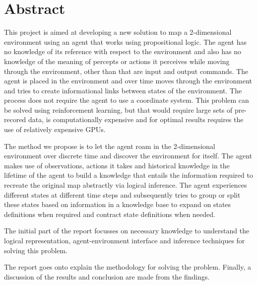 \chapter{Abstract}

%
%

This project is aimed at developing a new solution to map a 2-dimensional environment using an agent that works using propositional logic. The agent has no knowledge of its reference with respect to the environment and also has no knowledge of the meaning of percepts or actions it perceives while moving through the environment, other than that are input and output commands.  The agent is placed in the environment and over time moves through the environment and tries to create informational links between states of the environment. 
The process does not require the agent to use a coordinate system. This problem can be solved using reinforcement learning, but that would require large sets of pre-recored data, is computationally expensive and for optimal results requires the use of relatively expensive GPUs.

The method we propose is to let the agent roam in the 2-dimensional environment over discrete time and discover the environment for itself.
The agent makes use of observations, actions it takes and historical knowledge in the lifetime of the agent to build a knowledge that entails the information required to recreate the original map abstractly via logical inference. 
The agent experiences different states at different time steps and subsequently tries to group or split these states based on information in a knowledge base to expand on states definitions when required and contract state definitions when needed.


The initial part of the report focusses on necessary knowledge to understand the logical representation, agent-environment interface and inference techniques for solving this problem. 

The report goes onto explain the methodology for solving the problem.
Finally, a discussion of the results and conclusion are made from the findings.

